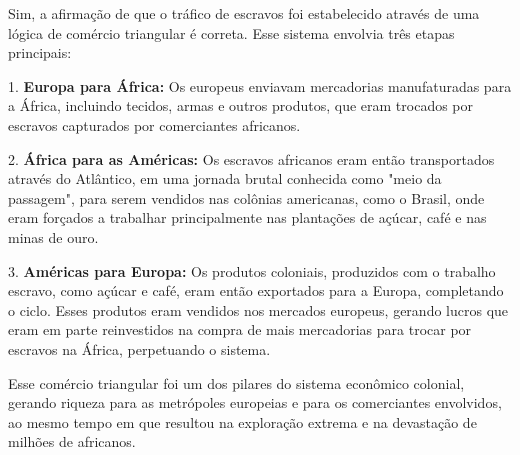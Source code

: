 \documentclass[a4paper,12pt]{article}[abntex2]
\begin{document}
Sim, a afirmação de que o tráfico de escravos foi estabelecido através de uma lógica de comércio triangular é correta. Esse sistema envolvia três etapas principais: 

1. \textbf{Europa para África:} Os europeus enviavam mercadorias manufaturadas para a África, incluindo tecidos, armas e outros produtos, que eram trocados por escravos capturados por comerciantes africanos.

2. \textbf{África para as Américas:} Os escravos africanos eram então transportados através do Atlântico, em uma jornada brutal conhecida como "meio da passagem", para serem vendidos nas colônias americanas, como o Brasil, onde eram forçados a trabalhar principalmente nas plantações de açúcar, café e nas minas de ouro.

3. \textbf{Américas para Europa:} Os produtos coloniais, produzidos com o trabalho escravo, como açúcar e café, eram então exportados para a Europa, completando o ciclo. Esses produtos eram vendidos nos mercados europeus, gerando lucros que eram em parte reinvestidos na compra de mais mercadorias para trocar por escravos na África, perpetuando o sistema.

Esse comércio triangular foi um dos pilares do sistema econômico colonial, gerando riqueza para as metrópoles europeias e para os comerciantes envolvidos, ao mesmo tempo em que resultou na exploração extrema e na devastação de milhões de africanos.
\end{document}
